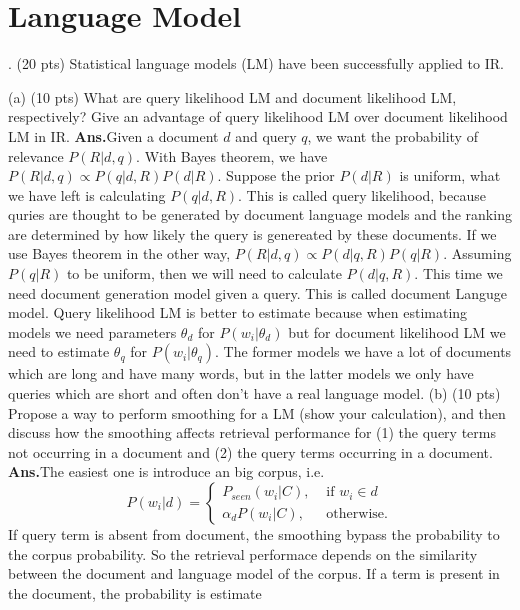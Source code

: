 \documentclass[11pt]{exam}
\newcommand{\ans}{\textbf{Ans.}}
\begin{document}
\section{Language Model}
\begin{questions}
  . (20 pts) Statistical language models (LM) have been successfully applied to IR.
  \begin{subparts}
    \subpart (a) (10 pts) What are query likelihood LM and document likelihood LM, respectively? Give an advantage of query likelihood LM over document likelihood LM in IR.
   \ans Given a document $d$ and query $q$, we want the probability of relevance 
   $P(R|d,q)$. With Bayes theorem, we have $P(R|d,q)\propto P(q|d,R)P(d|R)$. 
   Suppose the prior $P(d|R)$ is uniform, what we have left is calculating 
   $P(q|d,R)$. This is called query likelihood, because quries are thought to be 
   generated by document language models and the ranking are determined by how 
   likely the query is genereated by these documents. If we use Bayes theorem in 
   the other way, $P(R|d,q)\propto P(d|q,R)P(q|R)$. Assuming $P(q|R)$ to be 
   uniform, then we will need to calculate $P(d|q,R)$. This time we need 
   document generation model given a query. This is called document Languge 
   model. Query likelihood LM is better to estimate because when estimating models we need parameters $\theta_d$ 
   for $P(w_i|\theta_d)$ but for document likelihood LM we need to estimate $\theta_q$ 
   for $P(w_i|\theta_q)$. The former models we have a lot of documents which are 
   long and have many words, but in the latter models we only have queries which 
   are short and often don't have a real language model.
   \subpart (b) (10 pts) Propose a way to perform smoothing for a LM (show your calculation), and
then discuss how the smoothing affects retrieval performance for (1) the query terms not occurring in a document and (2) the query terms occurring in a document.
\ans The easiest one is introduce an big corpus, i.e. 
\begin{equation}
  P(w_i|d)=
\begin{cases}
  P_{seen}(w_i|C), &\mbox{ if $w_i \in d$ } \\
  \alpha_d P(w_i|C), &\mbox{ otherwise.}
\end{cases}
\end{equation}
If query term is absent from document, the smoothing bypass the probability to 
the corpus probability. So the retrieval performace depends on the similarity between the document and language model 
of the corpus. If a term is present in the document, the probability is estimate 

\end{subparts}
\end{questions}
\end{document}
